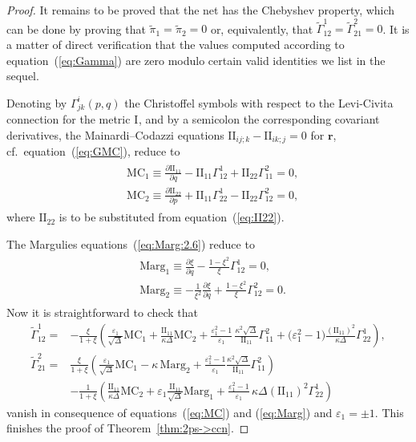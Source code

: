 \documentclass[pdftex]{sigma}
\let\ve\mathbf
\def\I#1#2{\mathrm{I}_{#1#2}}
\def\II#1#2{\mathrm{II}_{#1#2}}
\let\epsilon\varepsilon
\def\k{\kappa}
\def\eqref#1{{\rm(\ref{#1})}}
\numberwithin{equation}{section}
\begin{document}
\begin{proof}
It remains to be proved that the net has the Chebyshev property,
which can be done by proving that $\widetilde\pi_1 = \widetilde\pi_2 = 0$ or,
equivalently, that $\widetilde\Gamma^1_{12} = \widetilde\Gamma^2_{21} = 0$.
It is a matter of direct verification that the values computed
according to equation~\eqref{eq:Gamma} are zero modulo
certain valid identities we list in the sequel.

Denoting by $\Gamma^i_{jk}(p,q)$ the Christoffel symbols with respect
to the Levi-Civita connection for the metric $\I{}{}$, and by a semicolon the
corresponding covariant derivatives,
the Mainardi--Codazzi equations
$\mathrm{II}_{ij;k} - \mathrm{II}_{ik;j} = 0$
for $\ve r$, cf.~equation~\eqref{eq:GMC}, reduce to
\begin{gather}\label{eq:MC}
\begin{split}
& \mathrm{MC}_1 \equiv \frac{\partial\II 11}{\partial q}
 - \II 11 \Gamma^1_{12} + \II 22 \Gamma^2_{11} = 0,
\\
& \mathrm{MC}_2 \equiv \frac{\partial\II 22}{\partial p}
 + \II 11 \Gamma^1_{22} - \II 22 \Gamma^2_{12} = 0,
 \end{split}
\end{gather}
where $\II 22$ is to be substituted from equation~\eqref{eq:II22}.


The Margulies equations~\eqref{eq:Marg:2.6} reduce to
\begin{gather}\label{eq:Marg}
\begin{split}
& \mathrm{Marg}_1 \equiv \frac{\partial \xi}{\partial q}
 - \frac{1 - \xi^2}{\xi} \Gamma^1_{12} = 0,
\\
& \mathrm{Marg}_2 \equiv -\frac{1}{\xi^2} \frac{\partial \xi}{\partial q}
 + \frac{1 - \xi^2}{\xi} \Gamma^2_{12} = 0.
 \end{split}
\end{gather}
Now it is straightforward to check that
\begin{align*}
\widetilde\Gamma^1_{12} ={}&
 -\frac{\xi}{1 + \xi} \left(
    \frac{\epsilon_1}{\sqrt\Delta} \mathrm{MC}_1 %
   + \frac{\II11}{\kappa\Delta} \mathrm{MC}_2 %
   + \frac{\epsilon_1^2 - 1}{\epsilon_1}\, %
     \frac{\kappa^2 \sqrt\Delta}{\II11} \Gamma^2_{11}
   + \bigl(\epsilon_1^2 - 1\bigr) \frac{(\II11)^2}{\kappa\Delta} \Gamma^1_{22} %
 \right),
\\
\widetilde\Gamma^2_{21}   ={}&
 \frac{\xi}{1 + \xi} \left(
   \frac{\epsilon_1}{\sqrt\Delta} \mathrm{MC}_1 %
    - \k\,\mathrm{Marg}_2 %
    + \frac{\epsilon_1^2 - 1}{\epsilon_1}
      \frac{\kappa^2 \sqrt\Delta}{\II11} \Gamma^2_{11} %
 \right)
\\
 & - \frac{1}{1 + \xi} \left(
    \frac{\II11}{\k \Delta} \mathrm{MC}_2 %
     + \epsilon_1 \frac{\II11}{\sqrt\Delta} \mathrm{Marg}_1 %
     + \frac{\epsilon_1^2 - 1}{\epsilon_1}\,
        \kappa\Delta (\II11)^2 \Gamma^1_{22} \right)
\end{align*}
vanish in consequence of equations~\eqref{eq:MC} and \eqref{eq:Marg} and
$\epsilon_1 = \pm1$.
This finishes the proof of Theorem~\ref{thm:2ps->ccn}.
\end{proof}
\end{document}
